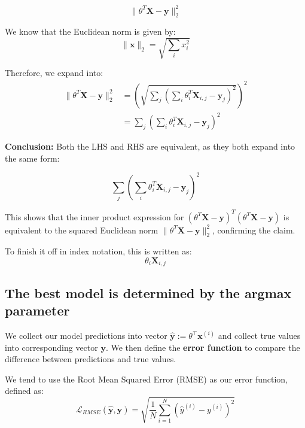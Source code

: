 \begin{equation}
    \| \theta^T \mathbf{X} - \mathbf{y} \|_2^2
\end{equation}

We know that the Euclidean norm is given by:
\begin{equation}
    \| \mathbf{x} \|_2 = \sqrt{\sum_i x_i^2}
\end{equation}

Therefore, we expand into:
\begin{align}
    \| \theta^T \mathbf{X} - \mathbf{y} \|_2^2 & = \left( \sqrt{\sum_j \left( \sum_i \theta_i^T \mathbf{X}_{i,j} - \mathbf{y}_j \right)^2} \right)^2 \\
                                               & = \sum_j \left( \sum_i \theta_i^T \mathbf{X}_{i,j} - \mathbf{y}_j \right)^2
\end{align}


\bigskip

\textbf{Conclusion:} Both the LHS and RHS are equivalent, as they both expand into the same form:

\begin{equation}
    \sum_j \left( \sum_i \theta_i^T \bm{X}_{i,j} - \bm{y}_j \right)^2
\end{equation}

This shows that the inner product expression for \( (\theta^T \bm{X} - \bm{y})^T (\theta^T \bm{X} - \bm{y}) \) is equivalent to the squared Euclidean norm \( \| \theta^T \bm{X} - \bm{y} \|_2^2 \), confirming the claim.
\bigskip

To finish it off in index notation, this is written as:
\begin{equation}
    \theta_i \bm{X}_{i,j}
\end{equation}

\subsection{The best model is determined by the argmax parameter}

We collect our model predictions into vector $\hat{\bm{y}} := \theta ^\top \bm{x}^{(i)}$ and collect true values into corresponding vector $\bm{y}$. We then define the \textbf{error function }to compare the difference between predictions and true values. \bigskip

We tend to use the Root Mean Squared Error (RMSE) as our error function, defined as:
\begin{equation}
    \mathcal{L}_{RMSE}(\hat{\bm{y}}, \bm{y}) = \sqrt{\frac{1}{N} \sum_{i=1}^{N} (\hat{y}^{(i)} - y^{(i)})^2}
\end{equation}

